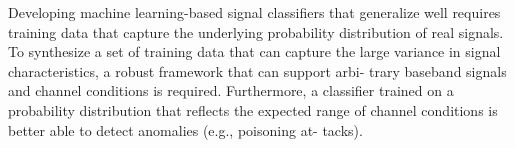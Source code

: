 Developing machine learning-based signal classifiers that generalize well
requires training data that capture the underlying probability distribution of
real signals.  To synthesize a set of training data that can capture the large
variance in signal characteristics, a robust framework that can support arbi-
trary baseband signals and channel conditions is required.  Furthermore, a
classifier trained on a probability distribution that reflects the expected range
of channel conditions is better able to detect anomalies (e.g., poisoning at-
tacks).